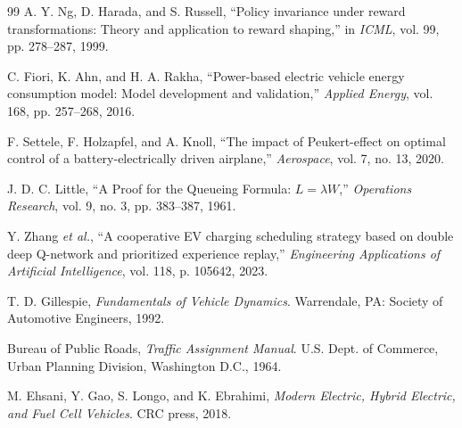\documentclass{article}
\begin{document}
\begin{thebibliography}{99}
A. Y. Ng, D. Harada, and S. Russell, ``Policy invariance under reward transformations: Theory and application to reward shaping,'' in \textit{ICML}, vol. 99, pp. 278--287, 1999.

C. Fiori, K. Ahn, and H. A. Rakha, ``Power-based electric vehicle energy consumption model: Model development and validation,'' \textit{Applied Energy}, vol. 168, pp. 257--268, 2016.

F. Settele, F. Holzapfel, and A. Knoll, ``The impact of Peukert-effect on optimal control of a battery-electrically driven airplane,'' \textit{Aerospace}, vol. 7, no. 13, 2020.

J. D. C. Little, ``A Proof for the Queueing Formula: $L=\lambda W$,'' \textit{Operations Research}, vol. 9, no. 3, pp. 383--387, 1961.

Y. Zhang \textit{et al.}, ``A cooperative EV charging scheduling strategy based on double deep Q-network and prioritized experience replay,'' \textit{Engineering Applications of Artificial Intelligence}, vol. 118, p. 105642, 2023.

T. D. Gillespie, \textit{Fundamentals of Vehicle Dynamics}. Warrendale, PA: Society of Automotive Engineers, 1992.

Bureau of Public Roads, \textit{Traffic Assignment Manual}. U.S. Dept. of Commerce, Urban Planning Division, Washington D.C., 1964.

M. Ehsani, Y. Gao, S. Longo, and K. Ebrahimi, \textit{Modern Electric, Hybrid Electric, and Fuel Cell Vehicles}. CRC press, 2018.
\end{thebibliography}
\end{document}
